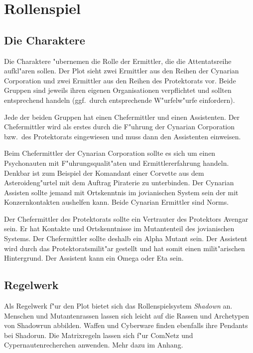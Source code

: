 \section{Rollenspiel}

\subsection{Die Charaktere}

Die Charaktere "ubernemen die Rolle der Ermittler, die die Attentatsreihe aufkl"aren sollen. Der Plot sieht zwei Ermittler aus den Reihen der Cynarian Corporation und zwei Ermittler aus den Reihen des Protektorats vor. Beide Gruppen sind jeweils ihren eigenen Organisationen verpflichtet und sollten entsprechend handeln (ggf.~durch entsprechende W"urfelw"urfe einfordern).

Jede der beiden Gruppen hat einen Chefermittler und einen Assistenten. Der Chefermittler wird als erstes durch die F"uhrung der Cynarian Corporation bzw.~des Protektorats eingewiesen und muss dann den Assistenten einweisen.

Beim Chefermittler der Cynarian Corporation sollte es sich um einen Psychonauten mit F"uhrungsqualit"aten und Ermittlererfahrung handeln. Denkbar ist zum Beispiel der Komandant einer Corvette aus dem Asteroideng"urtel mit dem Auftrag Piraterie zu unterbinden. Der Cynarian Assisten sollte jemand mit Ortskenntnis im jovianischen System sein der mit Konzernkontakten aushelfen kann. Beide Cynarian Ermittler sind Norms.

Der Chefermittler des Protektorats sollte ein Vertrauter des Protektors Avengar sein. Er hat Kontakte und Ortskenntnisse im Mutantenteil des jovianischen Systems. Der Chefermittler sollte deshalb ein Alpha Mutant sein. Der Assistent wird durch das Protektoratsmilit"ar gestellt und hat somit einen milit"arischen Hintergrund. Der Assistent kann ein Omega oder Eta sein.

\subsection{Regelwerk}

Als Regelwerk f"ur den Plot bietet sich das Rollenspielsystem \emph{Shadown} an. Menschen und Mutantenrassen lassen sich leicht auf die Rassen und Archetypen von Shadowrun abbilden. Waffen und Cyberware finden ebenfalls ihre Pendants bei Shadorun. Die Matrixregeln lassen sich f"ur ComNetz und Cypernautenrecherchen anwenden. Mehr dazu im Anhang.
